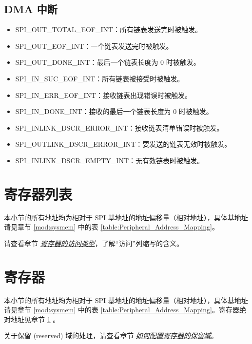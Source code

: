 \documentclass[main\_\_CN.tex]{subfiles}
\begin{document}
\subsection{DMA 中断}
\begin{itemize}
\item \label{int:SPIOUTTOTALEOFINT}SPI\_OUT\_TOTAL\_EOF\_INT：所有链表发送完时被触发。
\item \label{int:SPIOUTEOFINT}SPI\_OUT\_EOF\_INT：一个链表发送完时被触发。
\item \label{int:SPIOUTDONEINT}SPI\_OUT\_DONE\_INT：最后一个链表长度为 0 时被触发。
\item \label{int:SPIINSUCEOFINT}SPI\_IN\_SUC\_EOF\_INT：所有链表被接受时被触发。
\item \label{int:SPIINERREOFINT}SPI\_IN\_ERR\_EOF\_INT：接收链表出现错误时被触发。
\item \label{int:SPIINDONEINT}SPI\_IN\_DONE\_INT：接收的最后一个链表长度为 0 时被触发。
\item \label{int:SPIINLINKDSCRERRORINT}SPI\_INLINK\_DSCR\_ERROR\_INT：接收链表清单错误时被触发。
\item \label{int:SPIOUTLINKDSCRERRORINT}SPI\_OUTLINK\_DSCR\_ERROR\_INT：要发送的链表无效时被触发。
\item \label{int:SPIINLINKDSCREMPTYINT}SPI\_INLINK\_DSCR\_EMPTY\_INT：无有效链表时被触发。
\end{itemize}

\hypertarget{spi-reg-summ}{}
\section{寄存器列表}
\label{Section:SPIREGList}

本小节的所有地址均为相对于 SPI 基地址的地址偏移量（相对地址），具体基地址请见章节 \ref{mod:sysmem} \textit{} 中的表 \ref{table:Peripheral_Address_Mapping}。

请查看章节 \hyperref[glossary-access-types]{\textit{寄存器的访问类型}}，了解“访问”列缩写的含义。



\newpage

\section{寄存器}\label{Section:SPIREG}

本小节的所有地址均为相对于 SPI 基地址的地址偏移量（相对地址），具体基地址请见章节 \ref{mod:sysmem} \textit{} 中的表 \ref{table:Peripheral_Address_Mapping}。寄存器绝对地址见章节 \ref{Section:SPIREGList} \textit{}。

关于保留 (reserved) 域的处理，请查看章节 \hyperref[programming-reserved-field]{\textit{如何配置寄存器的保留域}}。



\end{document}
